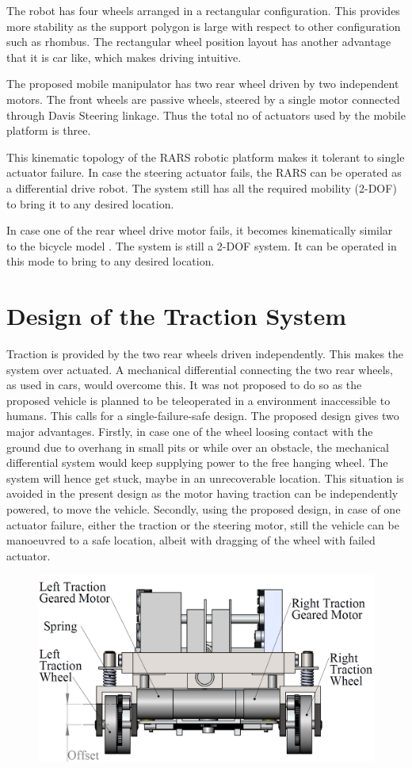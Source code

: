  The robot has four wheels arranged in a rectangular configuration. This provides  more stability as the support polygon is large with respect to other configuration such as rhombus. The rectangular wheel position layout has another advantage that it is car like, which makes driving intuitive. 
  
  The proposed mobile manipulator has two rear wheel  driven by two independent motors.  The front wheels are passive wheels, steered by a single motor connected through Davis Steering linkage. Thus the total no of actuators used by the mobile platform is three.
 
 This kinematic topology of the RARS robotic platform makes it tolerant to single actuator failure. In case the steering actuator fails, the RARS can be operated as a differential drive robot. The system still has all the required mobility (2-DOF) to bring it to any desired location.
 
 In case one of the rear wheel drive motor fails, it becomes kinematically similar to the bicycle model \cite{campion1996structural}. The system is still a 2-DOF system. It can be operated in this mode to bring to any desired location.
     

\section{Design of the Traction System}
Traction is provided by the two rear wheels driven independently. This makes the system over actuated. A mechanical differential connecting the two rear wheels, as used in cars,  would overcome this. It was not proposed to do so as the proposed vehicle is planned to be teleoperated in a environment inaccessible to humans. This calls for a single-failure-safe design. The proposed design gives two major advantages. 
Firstly, in case  one of the wheel loosing contact with the ground due to  overhang in small pits or while over an obstacle, the mechanical differential system would keep supplying power to the free hanging wheel. The system will hence get stuck, maybe in an unrecoverable location. This situation is avoided in the present design as the motor having traction can be independently powered, to move the vehicle.  
Secondly, using the proposed design, in case of one  actuator failure, either the traction or the steering motor, still the vehicle can be manoeuvred to a  safe location, albeit with dragging of the wheel with failed actuator.

 \begin{figure}[h]
	\centering
	\includegraphics[width=.7\linewidth,keepaspectratio]{Chapter3/fig/WheelOffset}
	\label{fig:tractionDrive}
\end{figure}

